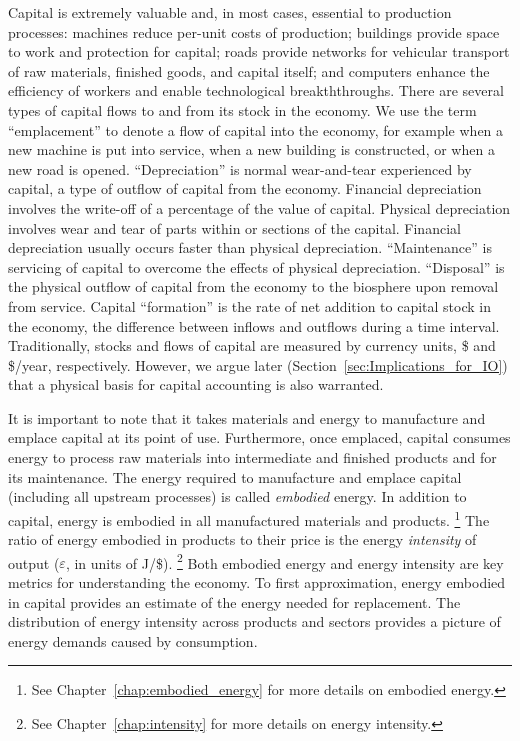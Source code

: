 Capital is extremely valuable and, in most cases, essential to production processes:
machines reduce per-unit costs of production;
buildings provide space to work and protection for capital;
roads provide networks for vehicular transport 
of raw materials, finished goods, and capital itself; and
computers enhance the efficiency of workers and enable technological breakththroughs.
There are several types of capital flows
to and from its stock in the economy.
We use the term ``emplacement'' to denote a flow of capital into
the economy, for example when a new machine is put into service,
when a new building is constructed, or
when a new road is opened.
``Depreciation'' is normal wear-and-tear experienced by capital, 
a type of outflow of capital from the economy.
Financial depreciation involves the write-off of a percentage 
of the value of capital.
Physical depreciation involves wear and tear of parts within or sections of the capital.
Financial depreciation usually occurs faster than physical depreciation.
``Maintenance'' is servicing of capital to overcome the effects of physical depreciation.
``Disposal'' is the physical outflow of capital from the economy to the biosphere
upon removal from service.
Capital ``formation'' is the rate of net
addition to capital stock in the economy,
the difference between inflows and outflows
during a time interval.
Traditionally, stocks and flows of capital are measured by currency units, 
\$ and \$/year, respectively.
However, we argue later (Section~\ref{sec:Implications_for_IO})
that a physical basis for capital accounting is also warranted.

It is important to note that it takes materials and energy
to manufacture and emplace capital at its point of use.
Furthermore, once emplaced,
capital consumes energy to process raw materials 
into intermediate and finished products
and for its maintenance.
The energy required to manufacture and emplace capital
(including all upstream processes)
is called \emph{embodied} energy.
In addition to capital, energy is embodied in all manufactured materials and
products.%
	\footnote{
	See Chapter~\ref{chap:embodied_energy} for more details
	on embodied energy.
	}
The ratio of energy embodied in products to their price 
is the energy \emph{intensity} of output ($\varepsilon$, 
in units of J/\$).%
	\footnote{
	See Chapter~\ref{chap:intensity} for more details 
	on energy intensity.
	}
Both embodied energy and energy intensity are key metrics 
for understanding the economy.
To first approximation, energy embodied in capital provides an estimate of the 
energy needed for replacement.
The distribution of energy intensity
across products and sectors
provides a picture of energy demands caused by consumption.

